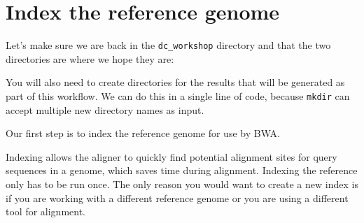 \documentclass[
  letterpaper,
  DIV=11,
  numbers=noendperiod]{scrreprt}
\newenvironment{Shaded}{\begin{snugshade}}{\end{snugshade}}
\newcommand{\AttributeTok}[1]{\textcolor[rgb]{0.40,0.45,0.13}{#1}}
\newcommand{\ExtensionTok}[1]{\textcolor[rgb]{0.00,0.23,0.31}{#1}}
\newcommand{\NormalTok}[1]{\textcolor[rgb]{0.00,0.23,0.31}{#1}}
\begin{document}
\hypertarget{index-the-reference-genome}{%
\section{Index the reference genome}\label{index-the-reference-genome}}

Let's make sure we are back in the \texttt{dc\_workshop} directory and
that the two directories are where we hope they are:

\begin{Shaded}
\end{Shaded}

You will also need to create directories for the results that will be
generated as part of this workflow. We can do this in a single line of
code, because \texttt{mkdir} can accept multiple new directory names as
input.

\begin{Shaded}
\end{Shaded}

Our first step is to index the reference genome for use by BWA.

\begin{Shaded}
\end{Shaded}

Indexing allows the aligner to quickly find potential alignment sites
for query sequences in a genome, which saves time during alignment.
Indexing the reference only has to be run once. The only reason you
would want to create a new index is if you are working with a different
reference genome or you are using a different tool for alignment.
\end{document}
